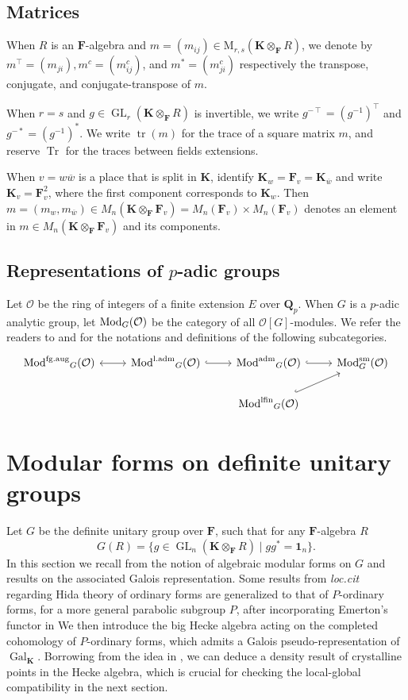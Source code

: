\documentclass[leqno]{amsart}
\theoremstyle{definition}
\theoremstyle{remark}
\newcommand{\id}{\mathbf{1}}
\newcommand{\oo}{\mathcal{O}}
\newcommand{\Qp}{\mathbf{Q}_p}
\DeclareMathOperator{\Tr}{Tr}
\DeclareMathOperator{\GL}{GL}
\DeclareMathOperator{\mtr}{tr}
\DeclareMathOperator{\Gal}{Gal}
\DeclareMathOperator{\Mod}{\textnormal{Mod}}
\DeclareMathOperator{\lfMod}{\textnormal{Mod}^{\textnormal{lfin}}}
\DeclareMathOperator{\laMod}{\textnormal{Mod}^{\textnormal{l.adm}}}
\DeclareMathOperator{\aMod}{\textnormal{Mod}^{\textnormal{adm}}}
\DeclareMathOperator{\fgMod}{\textnormal{Mod}^{\textnormal{fg.aug}}}
\newcommand{\sm}{\textnormal{sm}}
\newcommand{\F}{{\mathbf{F}}} %
\newcommand{\K}{{\mathbf{K}}} %
\newcommand{\bw}{\overline{w}}
\begin{document}
\subsection{Matrices}
When $R$ is an $\F$-algebra and 
$m=(m_{ij})\in \text{M}_{r,s}(\K\otimes_\F R)$,
we denote by 
$m^\intercal=(m_{ji}), 
m^c=(m^c_{ij})$, and
$m^*=(m^c_{ji})$
respectively the transpose, conjugate, and conjugate-transpose of $m$.

When $r=s$ and $g\in \GL_r(\K\otimes_\F R)$ is invertible, we write
$g^{-\intercal}=(g^{-1})^\intercal$ and $g^{-*}=(g^{-1})^*$.
We write $\mtr(m)$ for the trace of a square matrix $m$,
and reserve $\Tr$ for the traces between fields extensions.

When $v=w\bw$ is a place that is split in $\K$,
identify $\K_w=\F_v=\K_{\bw}$ and 
write $\K_v=\F_v^2$, 
where the first component corresponds to $\K_w$.
Then $m=(m_w,m_{\bw})\in M_n(\K\otimes_\F\F_v)=M_n(\F_v)\times M_n(\F_v)$ 
denotes an element in $m\in M_n(\K\otimes_\F\F_v)$ and its components.

\subsection{Representations of $p$-adic groups}

Let $\oo$ be the ring of integers of a finite extension $E$
over  $\Qp$.
When $G$ is a $p$-adic analytic group,
let $\Mod_G(\oo)$ be the category
of all $\oo[G]$-modules.
We refer the readers to \cite[\S 2]{emeI} and \cite[\S 2]{pask}
for the notations and definitions of the following subcategories.
\[
\begin{tikzcd}
	\fgMod_{G}(\oo) \arrow[r,leftrightarrow] &
	\laMod_{G}(\oo) \arrow[r,hookrightarrow] &
	\aMod_{G}(\oo) \arrow[r,hookrightarrow] &
	\Mod^{\sm}_{G}(\oo) \\
					       &&
	\lfMod_{G}(\oo) \arrow[ru,hookrightarrow] &
\end{tikzcd}
\]



\section{Modular forms on definite unitary groups}

Let $G$ be the definite unitary group over $\F$,
such that for any $\F$-algebra $R$
\[
    G(R)=\{g\in \GL_{n}(\K\otimes_\F R) \mid gg^*=\id_n\}.
\]
In this section we recall from \cite{ger}
the notion of algebraic modular forms on $G$
and results on the associated Galois representation.
Some results from \textit{loc.cit}
regarding Hida theory of ordinary forms
are generalized
to that of $P$-ordinary forms,
for a more general parabolic subgroup $P$,
after incorporating Emerton's functor in \cite{emeI}
We then introduce 
the big Hecke algebra acting on 
the completed cohomology of $P$-ordinary forms,
which admits a Galois pseudo-representation
of $\Gal_\K$.
Borrowing from the idea in \cite{pan},
we can deduce a density result
of crystalline points in the Hecke algebra,
which is crucial for checking 
the local-global compatibility in the next section.
\end{document}

